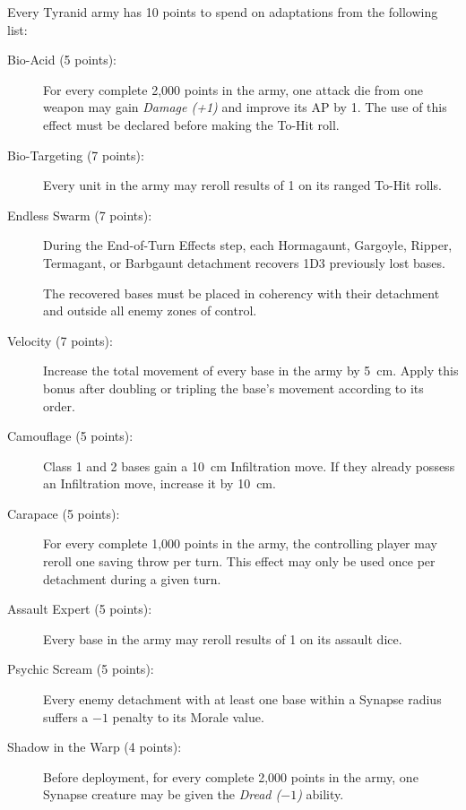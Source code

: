 Every Tyranid army has 10 points to spend on adaptations from the following list:

\begin{description}
    \item[Bio-Acid (5 points):]
    For every complete 2,000 points in the army, one attack die from one weapon may gain \textit{Damage (+1)} and improve its AP by 1. The use of this effect must be declared before making the To-Hit roll.

    \item[Bio-Targeting (7 points):]
    Every unit in the army may reroll results of 1 on its ranged To-Hit rolls.

    \item[Endless Swarm (7 points):]
    During the End-of-Turn Effects step, each Hormagaunt, Gargoyle, Ripper, Termagant, or Barbgaunt detachment recovers 1D3 previously lost bases.

    The recovered bases must be placed in coherency with their detachment and outside all enemy zones of control.

    \item[Velocity (7 points):]
    Increase the total movement of every base in the army by 5~cm. Apply this bonus after doubling or tripling the base's movement according to its order.

    \item[Camouflage (5 points):]
    Class 1 and 2 bases gain a 10~cm Infiltration move. If they already possess an Infiltration move, increase it by 10~cm.

    \item[Carapace (5 points):]
    For every complete 1,000 points in the army, the controlling player may reroll one saving throw per turn. This effect may only be used once per detachment during a given turn.

    \item[Assault Expert (5 points):]
    Every base in the army may reroll results of 1 on its assault dice.

    \item[Psychic Scream (5 points):]
    Every enemy detachment with at least one base within a Synapse radius suffers a $-1$ penalty to its Morale value.

    \item[Shadow in the Warp (4 points):]
    Before deployment, for every complete 2,000 points in the army, one Synapse creature may be given the \textit{Dread ($-1$)} ability.


\end{description}
